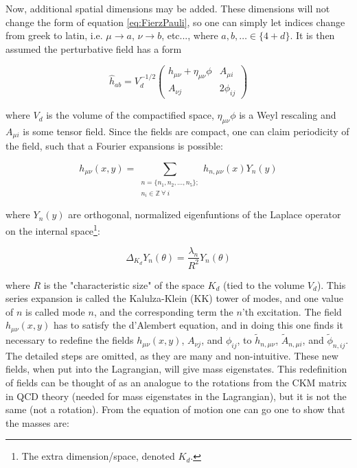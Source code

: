 \documentclass[11pt,a4paper]{article}
\begin{document}
Now, additional spatial dimensions may be added. These dimensions will not change the form of equation \ref{eq:FierzPauli}, so one can simply let indices change from greek to latin, i.e. $\mu\rightarrow a$, $\nu\rightarrow b$, etc..., where $a,b,\ldots \in \{4+d\}$. It is then assumed the perturbative field has a form

\begin{equation}
	\hat{h}_{ab} = 
	V_d^{-1/2}\begin{pmatrix}
	h_{\mu\nu} + \eta_{\mu\nu}\phi & A_{\mu i}\\
	A_{\nu j} & 2\phi_{ij}
	\end{pmatrix}
\end{equation}

where $V_d$ is the volume of the compactified space, $\eta_{\mu\nu}\phi$ is a Weyl rescaling and $A_{\mu i}$ is some tensor field. Since the fields are compact, one can claim periodicity of the field, such that a Fourier expansions is possible:

\begin{equation}
	h_{\mu\nu}(x,y) = \sum_{\substack{n=\{n_1,n_2,\ldots,n_5\}; \\ n_i\in\mathbb{Z}\:\forall\:i}} h_{n,\mu\nu}(x)Y_n(y)
\end{equation}

where $Y_n(y)$ are orthogonal, normalized eigenfuntions of the Laplace operator on the internal space\footnote{The extra dimension/space, denoted $K_d$.}:

\begin{equation}
\Delta_{K_d}Y_n(\theta) = \frac{\lambda_n}{R^2}Y_n(\theta)
\end{equation}

where $R$ is the "characteristic size" of the space $K_d$ (tied to the volume $V_d$). This series expansion is called the Kalulza-Klein (KK) tower of modes, and one value of $n$ is called mode $n$, and the corresponding term the $n$'th excitation. The field $h_{\mu\nu}(x,y)$ has to satisfy the d'Alembert equation, and in doing this one finds it necessary to redefine the fields $h_{\mu\nu}(x,y)$, $A_{\nu j}$, and $\phi_{ij}$, to $\tilde{h}_{n,\mu\nu}$, $\tilde{A}_{n,\mu i}$, and $\tilde{\phi}_{n,ij}$. The detailed steps are omitted, as they are many and non-intuitive. These new fields, when put into the Lagrangian, will give mass eigenstates. This redefinition of fields can be thought of as an analogue to the rotations from the CKM matrix in QCD theory (needed for mass eigenstates in the Lagrangian), but it is not the same (not a rotation). From the equation of motion one can go one to show that the masses are:
\end{document}
